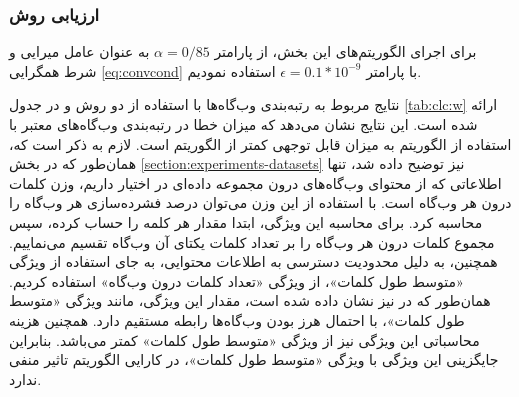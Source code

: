\documentclass[twoside, a4paper,11pt]{book}
\numberwithin{equation}{chapter}
\numberwithin{table}{chapter}
\numberwithin{figure}{chapter}
\numberwithin{equation}{chapter}
\begin{document}
\subsubsection{ارزیابی روش }
برای اجرای الگوریتم‌‌های این بخش، از پارامتر $\alpha = 0/85$ به عنوان عامل میرایی و شرط همگرایی \ref{eq:convcond} با پارامتر  $\epsilon = 0.1*10^{-9}$ استفاده نمودیم. 

نتایج مربوط به رتبه‌بندی وب‌گاه‌ها با استفاده از دو روش  و  در جدول \ref{tab:clc:w} ارائه شده است. این نتایج نشان می‌دهد که میزان خطا در رتبه‌بندی وب‌گاه‌های معتبر با استفاده از الگوریتم  به میزان قابل توجهی کمتر از الگوریتم  است. لازم به ذکر است که، همان‌طور که در بخش \ref{section:experiments-datasets} نیز توضیح داده شد، تنها اطلاعاتی که از  محتوای وب‌گاه‌های درون مجموعه داده‌ای  در اختیار داریم، وزن  کلمات درون هر وب‌گاه است. با استفاده از این وزن می‌توان درصد فشرده‌سازی هر وب‌گاه را محاسبه کرد. برای محاسبه این ویژگی، ابتدا مقدار  هر کلمه را حساب کرده، سپس مجموع  کلمات درون هر وب‌گاه را بر تعداد کلمات یکتای آن وب‌گاه تقسیم می‌نماییم.
همچنین، به دلیل محدودیت دسترسی به اطلاعات محتوایی، به جای استفاده از ویژگی «متوسط طول کلمات»، از ویژگی «تعداد کلمات درون وب‌گاه» استفاده کردیم. همان‌طور که در \cite{Ntoulas:2006} نیز نشان داده شده است، مقدار این ویژگی، مانند ویژگی «متوسط طول کلمات»، با احتمال هرز بودن وب‌گاه‌ها رابطه مستقیم دارد. همچنین هزینه محاسباتی این ویژگی نیز از ویژگی «متوسط طول کلمات» کمتر می‌باشد. بنابراین جایگزینی این ویژگی با ویژگی «متوسط طول کلمات»، در کارایی الگوریتم تاثیر منفی ندارد.
 
\end{document}
